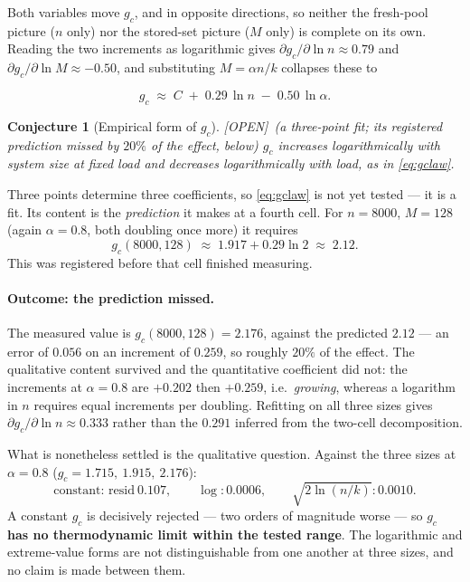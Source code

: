 \documentclass[11pt]{article}
\theoremstyle{definition}
\theoremstyle{plain}
\newtheorem{conjecture}[lemma]{Conjecture}
\newcommand{\OPEN}{\textnormal{\footnotesize\textsf{[OPEN]}}}
\begin{document}
Both variables move $g_c$, and in opposite directions, so neither the
fresh-pool picture ($n$ only) nor the stored-set picture ($M$ only) is
complete on its own. Reading the two increments as logarithmic gives
$\partial g_c/\partial \ln n \approx 0.79$ and
$\partial g_c/\partial \ln M \approx -0.50$, and substituting $M = \alpha n/k$
collapses these to

\begin{equation}\label{eq:gclaw}
  g_c \;\approx\; C \;+\; 0.29\,\ln n \;-\; 0.50\,\ln \alpha .
\end{equation}

\begin{conjecture}[Empirical form of $g_c$]\label{conj:gclaw} \OPEN\ (a three-point fit; its registered prediction missed by $20\%$ of the effect, below)
$g_c$ increases logarithmically with system size at fixed load and decreases
logarithmically with load, as in \eqref{eq:gclaw}.
\end{conjecture}

Three points determine three coefficients, so \eqref{eq:gclaw} is not yet
tested --- it is a fit. Its content is the \emph{prediction} it makes at a
fourth cell. For $n=8000$, $M=128$ (again $\alpha=0.8$, both doubling once
more) it requires
\[
  g_c(8000,128) \;\approx\; 1.917 + 0.29\ln 2 \;\approx\; \boxed{2.12}.
\]
This was registered before that cell finished measuring.

\paragraph{Outcome: the prediction missed.} The measured value is
$g_c(8000,128) = 2.176$, against the predicted $2.12$ --- an error of $0.056$
on an increment of $0.259$, so roughly $20\%$ of the effect. The qualitative
content survived and the quantitative coefficient did not: the increments at
$\alpha=0.8$ are $+0.202$ then $+0.259$, i.e.\ \emph{growing}, whereas a
logarithm in $n$ requires equal increments per doubling. Refitting on all three
sizes gives $\partial g_c/\partial\ln n \approx 0.333$ rather than the $0.291$
inferred from the two-cell decomposition.

What is nonetheless settled is the qualitative question. Against the three
sizes at $\alpha = 0.8$ ($g_c = 1.715,\ 1.915,\ 2.176$):
\[
  \text{constant: } \mathrm{resid}\ 0.107, \qquad
  \log: 0.0006, \qquad
  \sqrt{2\ln(n/k)}: 0.0010 .
\]
A constant $g_c$ is decisively rejected --- two orders of magnitude worse ---
so \textbf{$g_c$ has no thermodynamic limit within the tested range}. The
logarithmic and extreme-value forms are not distinguishable from one another at
three sizes, and no claim is made between them.
\end{document}
